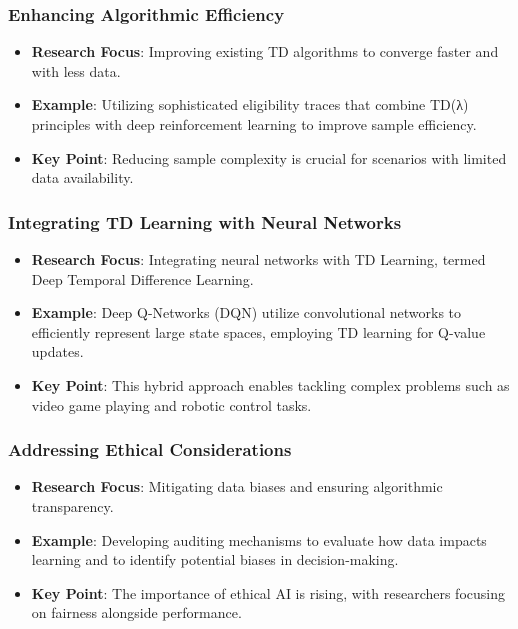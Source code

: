 \documentclass[aspectratio=169]{beamer}
\begin{document}
\begin{frame}[fragile]
    \frametitle{Enhancing Algorithmic Efficiency}
    
    \begin{itemize}
        \item \textbf{Research Focus}: Improving existing TD algorithms to converge faster and with less data.
        \item \textbf{Example}: Utilizing sophisticated eligibility traces that combine TD(λ) principles with deep reinforcement learning to improve sample efficiency.
        \item \textbf{Key Point}: Reducing sample complexity is crucial for scenarios with limited data availability.
    \end{itemize}
\end{frame}

\begin{frame}[fragile]
    \frametitle{Integrating TD Learning with Neural Networks}
    
    \begin{itemize}
        \item \textbf{Research Focus}: Integrating neural networks with TD Learning, termed Deep Temporal Difference Learning.
        \item \textbf{Example}: Deep Q-Networks (DQN) utilize convolutional networks to efficiently represent large state spaces, employing TD learning for Q-value updates.
        \item \textbf{Key Point}: This hybrid approach enables tackling complex problems such as video game playing and robotic control tasks.
    \end{itemize}
\end{frame}

\begin{frame}[fragile]
    \frametitle{Addressing Ethical Considerations}
    
    \begin{itemize}
        \item \textbf{Research Focus}: Mitigating data biases and ensuring algorithmic transparency.
        \item \textbf{Example}: Developing auditing mechanisms to evaluate how data impacts learning and to identify potential biases in decision-making.
        \item \textbf{Key Point}: The importance of ethical AI is rising, with researchers focusing on fairness alongside performance.
    \end{itemize}
\end{frame}
\end{document}
